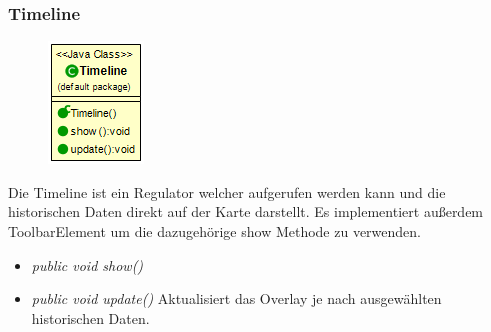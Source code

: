 \subsubsection{Timeline}
\begin{minipage}{0.3\textwidth}
    \begin{figure}[H]
        \includegraphics[scale = 0.5
        ]{media/view/toolbar/Timeline_Class.png}
    \end{figure}
    \end{minipage} \hfill
    \begin{minipage}{0.6\textwidth}
Die Timeline ist ein Regulator welcher aufgerufen werden kann und die historischen Daten direkt auf der Karte darstellt. Es implementiert außerdem ToolbarElement um die dazugehörige show Methode zu verwenden.
\end{minipage}
\begin{itemize} [noitemsep]
    \item \emph{public void show()}
    \item \emph{public void update()} Aktualisiert das Overlay je nach ausgewählten historischen Daten.
\end{itemize}

